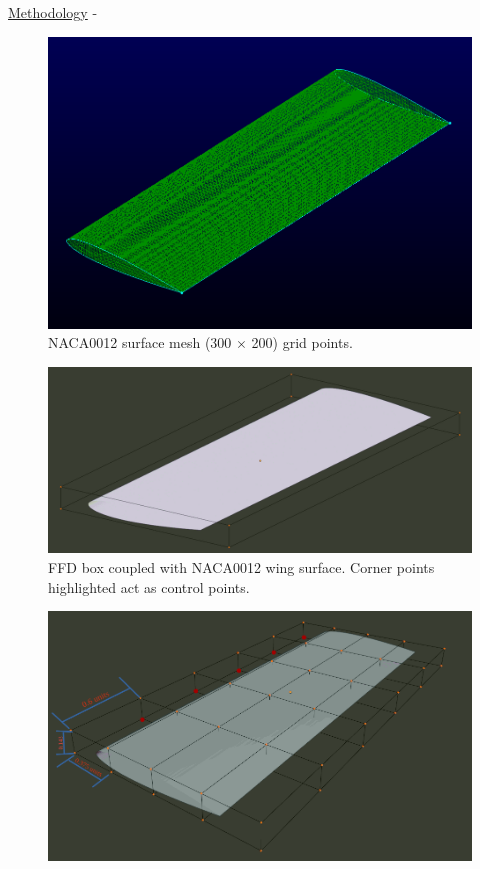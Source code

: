 \begin{frame}[allowframebreaks]{\underline{Methodology} -}
{\begin{figure}
    \includegraphics[scale=0.15]{figures/wing_3d.png}
    \caption{NACA0012 surface mesh (300 $\times$ 200) grid points.}
    \label{naca0012 wing mesh}
\end{figure}
}
\parbox{0.45\linewidth}{
\begin{figure}
    \centering
    \includegraphics[scale=0.1]{figures/wing_FFD_corner_pt.png}
    \caption{FFD box coupled with NACA0012 wing surface. Corner points highlighted act as control points.}
    \label{ffd_wing_corner}
\end{figure}
}
\parbox{0.47\linewidth}{
\begin{figure}
    \centering
    \includegraphics[scale=0.13]{figures/wing_all_cp_FFD.png}

\end{figure}}
\end{frame}
